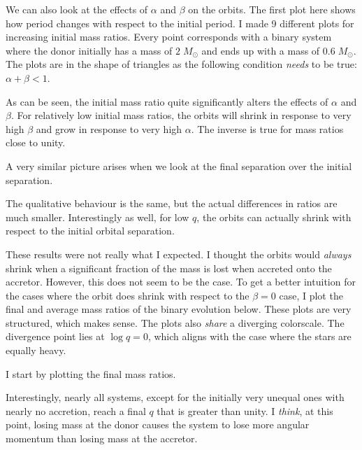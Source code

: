 \documentclass[a4paper,10pt]{article}
\begin{document}
We can also look at the effects of \(\alpha \) and \(\beta \) on the orbits.
The first plot here shows how period changes with respect to the initial period. I made 9 different plots for increasing initial mass ratios. Every point corresponds with a binary system where the donor initially has a mass of \(2\;M_\odot \) and ends up with a mass of \(0.6\;M_\odot \). The plots are in the shape of triangles as the following condition \emph{needs} to be true: \(\alpha + \beta < 1 \). 
\begin{figure}[ht]
    \centering
\end{figure}

As can be seen, the initial mass ratio quite significantly alters the effects of \(\alpha \) and \(\beta \). For relatively low initial mass ratios, the orbits will shrink in response to very high \(\beta \) and grow in response to very high \(\alpha \). The inverse is true for mass ratios close to unity.

A very similar picture arises when we look at the final separation over the initial separation.
\begin{figure}[ht]
    \centering
\end{figure}

The qualitative behaviour is the same, but the actual differences in ratios are much smaller. Interestingly as well, for low \(q\), the orbits can actually shrink with respect to the initial orbital separation.

\nextpage
These results were not really what I expected. I thought the orbits would \emph{always} shrink when a significant fraction of the mass is lost when accreted onto the accretor. However, this does not seem to be the case. To get a better intuition for the cases where the orbit does shrink with respect to the \(\beta = 0\) case, I plot the final and average mass ratios of the binary evolution below. These plots are very structured, which makes sense. The plots also \emph{share} a diverging colorscale. The divergence point lies at \(\log q = 0\), which aligns with the case where the stars are equally heavy. 

I start by plotting the final mass ratios.
\begin{figure}[ht]
    \centering
\end{figure}

Interestingly,  nearly all systems, except for the initially very unequal ones with nearly no accretion, reach a final \(q\) that is greater than unity. I \emph{think}, at this point, losing mass at the donor causes the system to lose more angular momentum than losing mass at the accretor.
\end{document}
